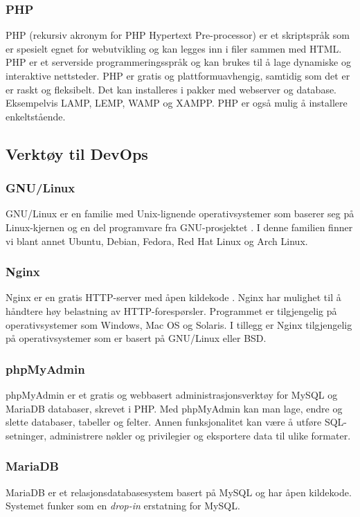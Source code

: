 \subsubsection{PHP}
PHP (rekursiv akronym for PHP Hypertext Pre-processor)\cite{McGrath2016pies} er et skriptspråk som er spesielt egnet for webutvikling og kan legges inn i filer sammen med HTML. PHP er et serverside programmeringsspråk og kan brukes til å lage dynamiske og interaktive nettsteder. PHP er gratis og plattformuavhengig, samtidig som det er  er raskt og fleksibelt. Det kan installeres i pakker med webserver og database. Eksempelvis LAMP, LEMP, WAMP og XAMPP. PHP er også mulig å installere enkeltstående. 

\subsection{Verktøy til DevOps}

\subsubsection{GNU/Linux}
GNU/Linux er en familie med Unix-lignende operativsystemer som baserer seg på Linux-kjernen \cite{kernel_org} og en del programvare fra GNU-prosjektet \cite{gnu_org}. I denne familien finner vi blant annet Ubuntu, Debian, Fedora, Red Hat Linux og Arch Linux.

\subsubsection{Nginx}
Nginx er en gratis HTTP-server med åpen kildekode \cite{nedelcu2010nginx}. Nginx har mulighet til å håndtere høy belastning av HTTP-forespørsler. Programmet er tilgjengelig på operativsystemer som Windows, Mac OS og Solaris. I tillegg er Nginx tilgjengelig på operativsystemer som er basert på GNU/Linux eller BSD.

\subsubsection{phpMyAdmin}
phpMyAdmin \cite{phpmyadmin2019bmt} er et gratis og webbasert administrasjonsverktøy for MySQL og MariaDB databaser, skrevet i PHP. Med phpMyAdmin kan man lage, endre og slette databaser, tabeller og felter. Annen funksjonalitet kan være å utføre SQL-setninger, administrere nøkler og privilegier og eksportere data til ulike formater.

\subsubsection{MariaDB}
MariaDB \cite{mariadb2019amd} er et relasjonsdatabasesystem basert på MySQL og har åpen kildekode. Systemet funker som en \textit{drop-in} erstatning for MySQL.

